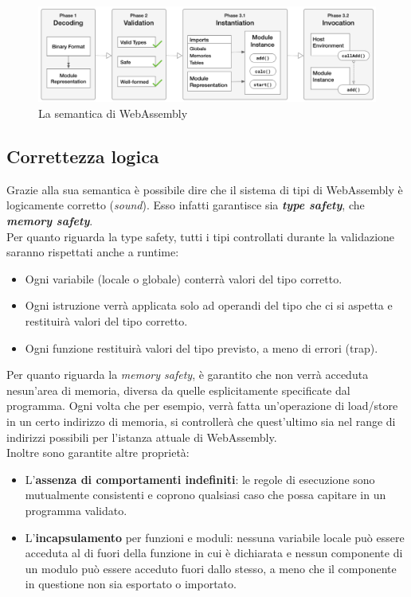 \begin{figure}
        \begin{center}
                \includegraphics[width=0.97\columnwidth]{images/wasmSemanticPhases.png}
        \end{center}
        \caption{La semantica di WebAssembly}
        \label{fig:wasmPhases}
\end{figure}

\newpage
\subsection{Correttezza logica}
\label{subsec:soundness}
Grazie alla sua semantica è possibile dire che il sistema di tipi di WebAssembly è logicamente corretto (\emph{sound})\cite*{wasm:soundness}. Esso infatti garantisce sia \emph{\textbf{type safety}}, che \emph{\textbf{memory safety}}.
\\Per quanto riguarda la type safety, tutti i tipi controllati durante la validazione saranno rispettati anche a runtime:
\begin{itemize}
        \item Ogni variabile (locale o globale) conterrà valori del tipo corretto.
        \item Ogni istruzione verrà applicata solo ad operandi del tipo che ci si aspetta e restituirà valori del tipo corretto.
        \item Ogni funzione restituirà valori del tipo previsto, a meno di errori (trap).
\end{itemize}
Per quanto riguarda la \emph{memory safety}, è garantito che non verrà acceduta nesun'area di memoria, diversa da quelle esplicitamente specificate dal programma. Ogni volta che per esempio, verrà fatta un'operazione di load/store in un certo indirizzo di memoria, si controllerà che quest'ultimo sia nel range di indirizzi possibili per l'istanza attuale di WebAssembly.
\\Inoltre sono garantite altre proprietà: 
\begin{itemize}
        \item L'\textbf{assenza di comportamenti indefiniti}: le regole di esecuzione sono mutualmente consistenti e coprono qualsiasi caso che possa capitare in un programma validato.
        \item L'\textbf{incapsulamento} per funzioni e moduli: nessuna variabile locale può essere acceduta al di fuori della funzione in cui è dichiarata e nessun componente di un modulo può essere acceduto fuori dallo stesso, a meno che il componente in questione non sia esportato o importato.
\end{itemize}
